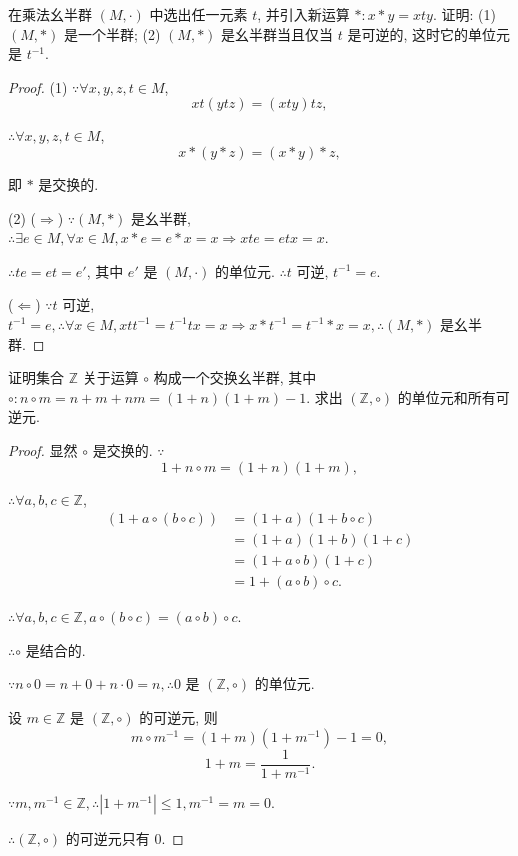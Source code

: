 \documentclass[color=black,device=normal,lang=cn,mode=geye]{elegantnote}
\begin{document}
\begin{exercise}%
    在乘法幺半群 $(M,\cdot)$ 中选出任一元素 $t$, 并引入新运算 $*:x*y=xty$. 证明: (1) $(M,*)$ 是一个半群; (2) $(M,*)$ 是幺半群当且仅当 $t$ 是可逆的, 这时它的单位元是 $t^{-1}$.
\end{exercise}
\begin{proof}
    (1) $\because\forall x,y,z,t\in M$,
    \[xt(ytz)=(xty)tz,\]

    $\therefore\forall x,y,z,t\in M$,
    \[x*(y*z)=(x*y)*z,\]

    即 $*$ 是交换的.

    (2) ($\Rightarrow$) $\because(M,*)$ 是幺半群, $\therefore\exists e\in M,\forall x\in M,x*e=e*x=x\Rightarrow xte=etx=x$.

    $\therefore te=et=e'$, 其中 $e'$ 是 $(M,\cdot)$ 的单位元. $\therefore t$ 可逆, $t^{-1}=e$.

    ($\Leftarrow$) $\because t$ 可逆, $t^{-1}=e,\therefore\forall x\in M,xtt^{-1}=t^{-1}tx=x\Rightarrow x*t^{-1}=t^{-1}*x=x,\therefore(M,*)$ 是幺半群.
\end{proof}
\begin{exercise}%
    证明集合 $\mathbb{Z}$ 关于运算 $\circ$ 构成一个交换幺半群, 其中 $\circ:n\circ m=n+m+nm=(1+n)(1+m)-1$. 求出 $(\mathbb{Z},\circ)$ 的单位元和所有可逆元.
\end{exercise}
\begin{proof}
    显然 $\circ$ 是交换的. $\because$
    \[1+n\circ m=(1+n)(1+m),\]

    $\therefore\forall a,b,c\in\mathbb{Z}$,
    \begin{align*}
        (1+a\circ(b\circ c)) & =(1+a)(1+b\circ c) \\
        & =(1+a)(1+b)(1+c) \\
        & =(1+a\circ b)(1+c) \\
        & =1+(a\circ b)\circ c.
    \end{align*}

    $\therefore\forall a,b,c\in\mathbb{Z},a\circ(b\circ c)=(a\circ b)\circ c$.

    $\therefore\circ$ 是结合的.

    $\because n\circ 0=n+0+n\cdot0=n,\therefore0$ 是 $(\mathbb{Z},\circ)$ 的单位元.

    设 $m\in\mathbb{Z}$ 是 $(\mathbb{Z},\circ)$ 的可逆元, 则
    \[m\circ m^{-1}=(1+m)(1+m^{-1})-1=0,\]
    \[1+m=\dfrac{1}{1+m^{-1}}.\]

    $\because m,m^{-1}\in\mathbb{Z},\therefore|1+m^{-1}|\leq1,m^{-1}=m=0$.

    $\therefore(\mathbb{Z},\circ)$ 的可逆元只有 $0$.
\end{proof}
\end{document}

